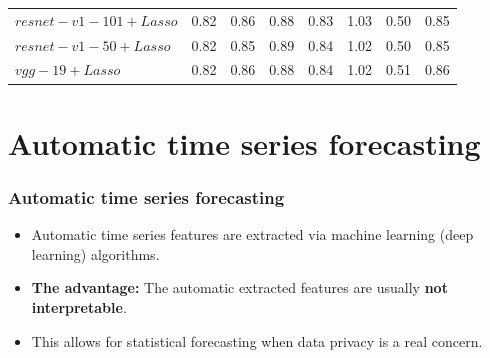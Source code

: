 \documentclass[10pt,aspectratio=43]{beamer}
\begin{document}
\begin{frame}
\begin{table}
{\begin{tabular}{llllllll}
      $resnet-v1-101+Lasso$      & 0.82 & 0.86 & 0.88 & 0.83 & 1.03 & 0.50 & 0.85   \\
       $resnet-v1-50+Lasso$          & 0.82 & 0.85 & 0.89 & 0.84 & 1.02 & 0.50 & 0.85\\
        $vgg-19+Lasso$        & 0.82 & 0.86 & 0.88 & 0.84 & 1.02 & 0.51 & 0.86 \\
      \bottomrule
    \end{tabular}
  }
\end{table}

\end{frame}

\section{Automatic time series forecasting}

\begin{frame}
  \frametitle{Automatic time series forecasting}
  \begin{itemize}
  \item Automatic time series features are extracted via machine learning (deep learning)
    algorithms.
  \item \textbf{The advantage:} The automatic extracted features are usually \textbf{not
      interpretable}.

  \item This allows for statistical forecasting when data privacy is a real concern.

  \end{itemize}

\end{frame}
\end{document}
